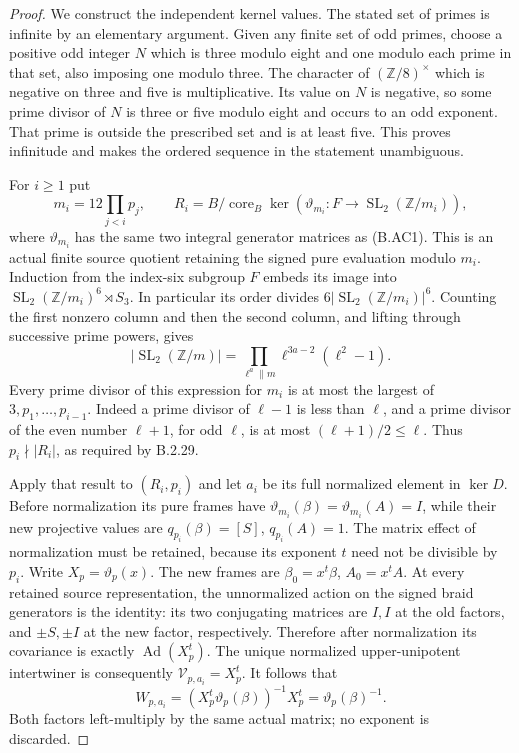 \begin{proof}
We construct the independent kernel values.
The stated set of primes is infinite by an elementary
argument.  Given any finite set of odd primes, choose
a positive odd integer $N$ which is three modulo eight
and one modulo each prime in that set, also imposing
one modulo three.  The character of
$(\mathbb Z/8)^\times$ which is negative on three
and five is multiplicative.  Its value on $N$ is
negative, so some prime divisor of $N$ is three
or five modulo eight and occurs to an odd exponent.
That prime is outside the prescribed set and is
at least five.  This proves infinitude and makes the
ordered sequence in the statement unambiguous.

For $i\geq1$ put
\[
 m_i=12\prod_{j<i}p_j,\qquad
 R_i=B/\operatorname{core}_B
           \ker\!\left(\vartheta_{m_i}:F\to
                   \operatorname{SL}_2(\mathbb Z/m_i)\right),
 \tag{B.AC13}
\]
where $\vartheta_{m_i}$ has the same two integral
generator matrices as (B.AC1).
This is an actual finite source quotient retaining
the signed pure evaluation modulo $m_i$.
Induction from the index-six subgroup $F$ embeds
its image into
$\operatorname{SL}_2(\mathbb Z/m_i)^6\rtimes S_3$.
In particular its order divides
$6|\operatorname{SL}_2(\mathbb Z/m_i)|^6$.
Counting the first nonzero column and then the
second column, and lifting through successive
prime powers, gives
\[
 |\operatorname{SL}_2(\mathbb Z/m)|
       =\prod_{\ell^a\parallel m}\ell^{3a-2}(\ell^2-1).
 \tag{B.AC14}
\]
Every prime divisor of this expression for $m_i$
is at most the largest of $3,p_1,\ldots,p_{i-1}$.
Indeed a prime divisor of $\ell-1$ is less than
$\ell$, and a prime divisor of the even number
$\ell+1$, for odd $\ell$, is at most
$(\ell+1)/2\leq\ell$.
Thus $p_i\nmid|R_i|$, as required by B.2.29.

Apply that result to $(R_i,p_i)$ and let $a_i$
be its full normalized element in $\ker D$.
Before normalization its pure frames have
$\vartheta_{m_i}(\beta)=\vartheta_{m_i}(A)=I$,
while their new projective values are
$q_{p_i}(\beta)=[S]$, $q_{p_i}(A)=1$.
The matrix effect of normalization must be retained,
because its exponent $t$ need not be divisible by
$p_i$.  Write $X_p=\vartheta_p(x)$.
The new frames are
$\beta_0=x^t\beta$, $A_0=x^tA$.
At every retained source representation, the
unnormalized action on the signed braid generators
is the identity: its two conjugating matrices are
$I,I$ at the old factors, and $\pm S,\pm I$ at
the new factor, respectively.  Therefore after
normalization its covariance is exactly
$\operatorname{Ad}(X_p^t)$.
The unique normalized upper-unipotent intertwiner
is consequently $\mathcal V_{p,a_i}=X_p^t$.
It follows that
\[
 W_{p,a_i}
  =(X_p^t\vartheta_p(\beta))^{-1}X_p^t
  =\vartheta_p(\beta)^{-1}.
 \tag{B.AC15}
\]
Both factors left-multiply by the same actual
matrix; no exponent is discarded.


\end{proof}
